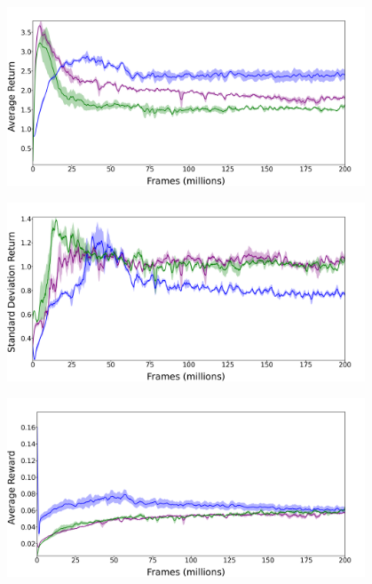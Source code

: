 \documentclass[draft,final]{vutinfth} %
\begin{document}
    \newpage
    \begin{figure}[H]
        \centering
        \includegraphics[width=0.95\textwidth]{figures/breakout/Breakout_retmean.png}
    \end{figure}
    \begin{figure}[H]
        \centering
        \includegraphics[width=0.95\textwidth]{figures/breakout/Breakout_retstd.png}
    \end{figure}

    \newpage
    \begin{figure}[H]
        \centering
        \includegraphics[width=0.95\textwidth]{figures/breakout/Breakout_rew_mean.png}
    \end{figure}
\end{document}
